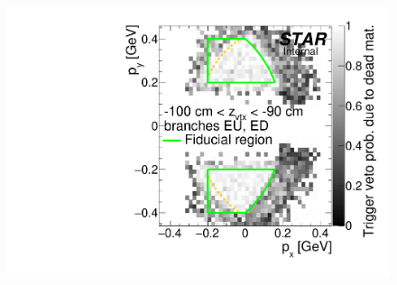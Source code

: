 \begin{figure}[hb]
{  \includegraphics[width=\linewidth,page=18]{graphics/corrections/mcDeadMatProbPxPy.pdf}
}%
\end{figure}


